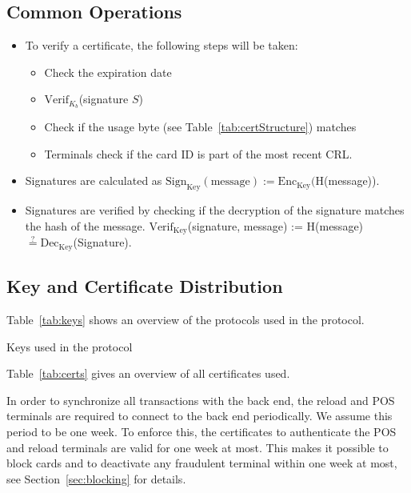 \documentclass{article}
\begin{document}
\subsection{Common Operations}
\begin{itemize}
    \item To verify a certificate, the following steps will be taken:
        \begin{itemize}
            \item Check the expiration date
            \item $\textrm{Verif}_{K_b}$(signature $S$)
            \item Check if the usage byte (see Table~\ref{tab:certStructure}) matches
            \item Terminals check if the card ID is part of the most recent CRL\@.
        \end{itemize}

    \item Signatures are calculated as $\textrm{Sign}_{\textrm{Key}}(\textrm{message}) := \textrm{Enc}_{\textrm{Key}}($H(message)).

    \item Signatures are verified by checking if the decryption of the signature matches the hash of the message.
    $\textrm{Verif}_{\textrm{Key}}$(signature, message) := H(message) $\stackrel{?}{=} \textrm{Dec}_{\textrm{Key}}$(Signature).
\end{itemize}

\subsection{Key and Certificate Distribution}

Table~\ref{tab:keys} shows an overview of the protocols used in the protocol.
\begin{table}[h]
    \centering
    
    \caption{Keys used in the protocol}
    \label{tab:keys}
\end{table}

Table~\ref{tab:certs} gives an overview of all certificates used.

In order to synchronize all transactions with the back end, the reload and POS terminals are required to connect to the back end periodically.
We assume this period to be one week.
To enforce this, the certificates to authenticate the POS and reload terminals are valid for one week at most.
This makes it possible to block cards and to deactivate any fraudulent terminal within one week at most, see Section~\ref{sec:blocking} for details.
\end{document}
